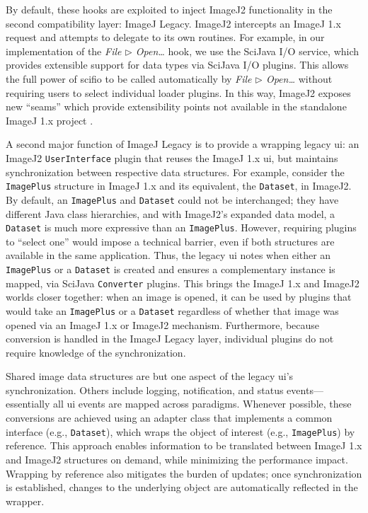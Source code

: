 \documentclass{bmcart}
\begin{document}
By default, these hooks are exploited to inject ImageJ2 functionality in the
second compatibility layer: ImageJ Legacy. ImageJ2 intercepts an ImageJ 1.x
request and attempts to delegate to its own routines. For example, in our
implementation of the \textit{File $\triangleright$ Open\ldots} hook, we use
the SciJava I/O service, which provides extensible support for data types via
SciJava I/O plugins. This allows the full power of \acrshort{scifio} to be
called automatically by \textit{File $\triangleright$ Open\ldots} without
requiring users to select individual loader plugins. In this way, ImageJ2
exposes new ``seams'' which provide extensibility points not available in the
standalone ImageJ 1.x project \cite{legacy_code}.

A second major function of ImageJ Legacy is to provide a wrapping legacy
\acrshort{ui}: an ImageJ2 \texttt{UserInterface} plugin that reuses the ImageJ
1.x \acrshort{ui}, but maintains synchronization between respective data
structures. For example, consider the \texttt{ImagePlus} structure in ImageJ
1.x and its equivalent, the \texttt{Dataset}, in ImageJ2. By default, an
\texttt{ImagePlus} and \texttt{Dataset} could not be interchanged; they have
different Java class hierarchies, and with ImageJ2's expanded data model, a
\texttt{Dataset} is much more expressive than an \texttt{ImagePlus}. However,
requiring plugins to ``select one'' would impose a technical barrier, even if
both structures are available in the same application. Thus, the legacy
\acrshort{ui} notes when either an \texttt{ImagePlus} or a \texttt{Dataset} is
created and ensures a complementary instance is mapped, via SciJava
\texttt{Converter} plugins. This brings the ImageJ 1.x and ImageJ2 worlds
closer together: when an image is opened, it can be used by plugins that would
take an \texttt{ImagePlus} or a \texttt{Dataset} regardless of whether that
image was opened via an ImageJ 1.x or ImageJ2 mechanism. Furthermore, because
conversion is handled in the ImageJ Legacy layer, individual plugins do not
require knowledge of the synchronization.

Shared image data structures are but one aspect of the legacy \acrshort{ui}'s
synchronization. Others include logging, notification, and status
events---essentially all \acrshort{ui} events are mapped across paradigms.
Whenever possible, these conversions are achieved using an adapter class that
implements a common interface (e.g., \texttt{Dataset}), which wraps the object
of interest (e.g., \texttt{ImagePlus}) by reference. This approach enables
information to be translated between ImageJ 1.x and ImageJ2 structures on
demand, while minimizing the performance impact. Wrapping by reference also
mitigates the burden of updates; once synchronization is established, changes
to the underlying object are automatically reflected in the wrapper.
\end{document}
